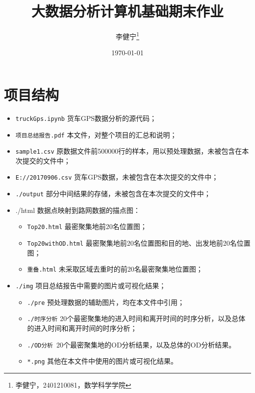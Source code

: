 \documentclass[UTF8]{ctexart}
\title{大数据分析计算机基础期末作业}
\date{\today}
\author{李健宁\thanks{李健宁，2401210081，数学科学学院}}
\begin{document}
\maketitle

\tableofcontents

\clearpage

\section{项目结构}

\begin{itemize}[itemsep=0pt,topsep=0pt]
    \item \texttt{truckGps.ipynb} 货车GPS数据分析的源代码；
    \item \texttt{项目总结报告.pdf} 本文件，对整个项目的汇总和说明；
    \item \texttt{sample1.csv} 原数据文件前500000行的样本，用以预处理数据，未被包含在本次提交的文件中；
    \item \texttt{E://20170906.csv} 货车GPS数据，未被包含在本次提交的文件中；
    \item \texttt{./output} 部分中间结果的存储，未被包含在本次提交的文件中；
    \item ./html 数据点映射到路网数据的描点图：
        \begin{itemize} [itemsep=0pt,topsep=0pt]
            \item \texttt{Top20.html} 最密聚集地前20名位置图；
            \item \texttt{Top20withOD.html} 最密聚集地前20名位置图和目的地、出发地前20名位置图；
            \item \texttt{重叠.html} 未采取区域去重时的前20名最密聚集地位置图；
        \end{itemize}   
    \item \texttt{./img} 项目总结报告中需要的图片或可视化结果；
        \begin{itemize}[itemsep=0pt,topsep=0pt]
            \item \texttt{./pre} 预处理数据的辅助图片，均在本文件中引用；
            \item \texttt{./时序分析}  20个最密聚集地的进入时间和离开时间的时序分析，以及总体的进入时间和离开时间的时序分析；
            \item \texttt{./OD分析}\  20个最密聚集地的OD分析结果，以及总体的OD分析结果。
            \item \texttt{*.png} 其他在本文件中使用的图片或可视化结果。
        \end{itemize}
\end{itemize}
\end{document}

